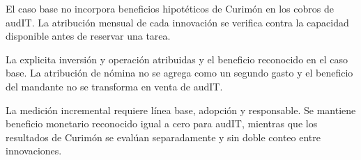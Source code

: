 El caso base no incorpora beneficios hipotéticos de Curimón en los cobros de audIT. La atribución
mensual de cada innovación se verifica contra la capacidad disponible antes de reservar una tarea.

La  explicita inversión y operación atribuidas y el beneficio
reconocido en el caso base. La atribución de nómina no se agrega como un segundo gasto y el
beneficio del mandante no se transforma en venta de audIT.


La medición incremental requiere línea base, adopción y responsable. Se mantiene beneficio
monetario reconocido igual a cero para audIT, mientras que los resultados de Curimón se
evalúan separadamente y sin doble conteo entre innovaciones.
